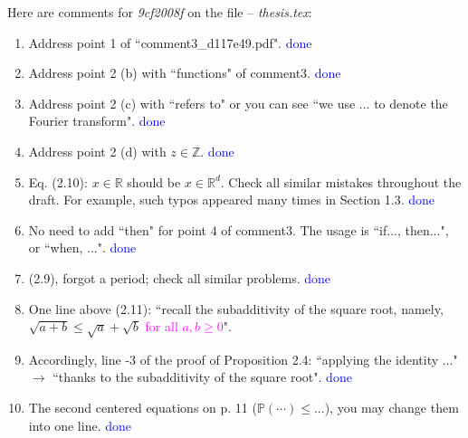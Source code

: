\documentclass[a4paper,10pt]{article}
\def\R{\mathbb{R}}
\begin{document}
Here are comments for {\it 9cf2008f} on the file -- {\it thesis.tex}:

\begin{enumerate}
  \item Address point 1 of ``comment3\_d117e49.pdf". \textcolor{blue}{done}
  \item Address point 2 (b) with ``functions" of comment3. \textcolor{blue}{done}
  \item Address point 2 (c) with ``refers to" or you can see ``we use ... to denote the Fourier transform". \textcolor{blue}{done}
  \item Address point 2 (d) with $z\in \mathbb{Z}$. \textcolor{blue}{done}
  \item Eq. (2.10): $x\in\R$ should be $x\in\R^d$. Check all similar mistakes throughout the draft. For example, such
    typos appeared many times in Section 1.3. \textcolor{blue}{done}
  \item No need to add ``then" for point 4 of comment3. The usage is ``if..., then...", or ``when, ...". \textcolor{blue}{done}
  \item (2.9), forgot a period; check all similar problems. \textcolor{blue}{done}
  \item One line above (2.11): ``recall the subadditivity of the square root, namely, $\sqrt{a+b}\le \sqrt{a}+\sqrt{b}$
    \textcolor{magenta}{for all $a,b\ge 0$}".
  \item[] Accordingly, line -3 of the proof of Proposition 2.4: ``applying the identity ..." $\to$ ``thanks to the
    subadditivity of the square root". \textcolor{blue}{done}
  \item The second centered equations on p. 11 ($\mathbb{P}\left(\cdots\right)\le ...$), you may change them into one line. \textcolor{blue}{done}
\end{enumerate}
\end{document}
